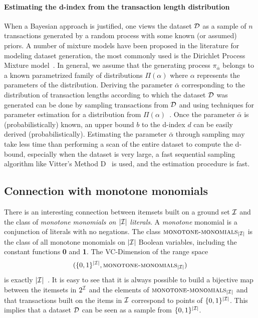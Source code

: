 \paragraph{Estimating the d-index from the transaction length distribution} When
a Bayesian approach is justified, one views the dataset ${\cal D}$ as a sample of $n$
transactions generated by a random process with some known (or assumed) priors.
A number of mixture models have been proposed in the literature for modeling
dataset generation, the most commonly used is the Dirichlet Process Mixture
model~\cite{HeS12}.
In general, we assume that the generating process 
$\pi_{\bar{\alpha}}$ belongs to a known parametrized family of distributions
$\Pi(\alpha)$ where $\alpha$ represents the parameters of the distribution.
Deriving the parameter $\bar\alpha$ corresponding to the distribution of
transaction lengths according to which the dataset ${\cal D}$ was generated can be
done by sampling transactions from ${\cal D}$ and using techniques for parameter
estimation for a distribution from $\Pi(\alpha)$~\cite{LehmannC98,HastieTF09}.
Once the parameter $\bar\alpha$ is (probabilistically) known, an upper bound $b$
to the d-index $d$ can be easily derived (probabilistically).  
Estimating the parameter $\bar\alpha$ through sampling may take less time than
performing a scan of the entire dataset to compute the d-bound, especially when
the dataset is very large, a fast sequential sampling algorithm like Vitter's
Method D~\cite{Vitter87} is used, and the estimation procedure is fast.

\subsection{Connection with monotone monomials}\label{sec:vcminemonomials}
There is an interesting connection between itemsets built on a ground set
${\cal I}$ and 
the class of \emph{monotone monomials on $|{\cal I}|$ literals}. 
A \emph{monotone} monomial is a conjunction of literals with no negations. The
class $\textsc{monotone-monomials}_{|{\cal I}|}$ is the class of
all monotone monomials on $|{\cal I}|$ Boolean variables, including the constant functions
{\bf 0} and {\bf 1}. The VC-Dimension of the range space
\[
(\{0,1\}^{|{\cal I}|},\textsc{monotone-monomials}_{|{\cal I}|})\]
is exactly $|{\cal I}|$~\cite[Coroll.~3]{NatschlagerS96}. It is easy to see that it is always
possible to build a bijective map between the itemsets in $2^{\cal I}$ and the
elements of $\textsc{monotone-monomials}_{|{\cal I}|}$ and that transactions built
on the items in ${\cal I}$ correspond to points of $\{0,1\}^{|{\cal I}|}$. This implies
that a dataset ${\cal D}$ can be seen as a sample from $\{0,1\}^{|{\cal I}|}$.

